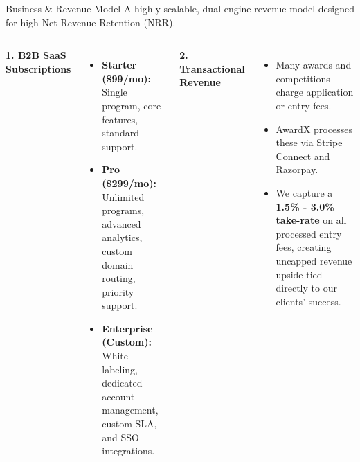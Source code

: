 \documentclass[aspectratio=169, 10pt]{beamer}
\begin{document}
\begin{frame}{Business \& Revenue Model}
    A highly scalable, dual-engine revenue model designed for high Net Revenue Retention (NRR).
    
    \vspace{0.4cm}
    \begin{columns}[T]
        \textbf{1. B2B SaaS Subscriptions}
        \vspace{0.2cm}
        \begin{itemize}
            \item \textbf{Starter (\$99/mo):} Single program, core features, standard support.
            \item \textbf{Pro (\$299/mo):} Unlimited programs, advanced analytics, custom domain routing, priority support.
            \item \textbf{Enterprise (Custom):} White-labeling, dedicated account management, custom SLA, and SSO integrations.
        \end{itemize}
        
        \textbf{2. Transactional Revenue}
        \vspace{0.2cm}
        \begin{itemize}
            \item Many awards and competitions charge application or entry fees.
            \item AwardX processes these via Stripe Connect and Razorpay.
            \item We capture a \textbf{1.5\% - 3.0\% take-rate} on all processed entry fees, creating uncapped revenue upside tied directly to our clients' success.
        \end{itemize}
    \end{columns}
\end{frame}
\end{document}

